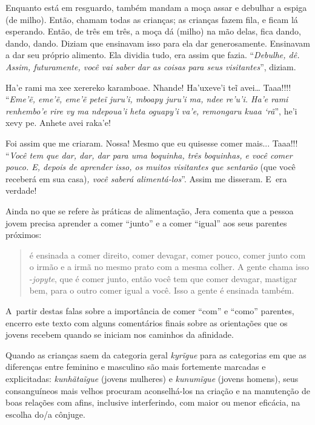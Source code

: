 \begin{paracol}{2}
\bigskip

\switchcolumn
\noindent
Enquanto está em resguardo, também mandam a moça assar e debulhar a
espiga (de milho). Então, chamam todas as crianças; as crianças fazem
fila, e ficam lá esperando. Então, de três em três, a moça dá (milho) na
mão delas, fica dando, dando, dando. Diziam que ensinavam isso para ela
dar generosamente. Ensinavam a dar seu próprio alimento. Ela dividia
tudo, era assim que fazia. ``\emph{Debulhe, dê. Assim, futuramente, você
vai saber dar as coisas para seus visitantes}'', diziam. 

\smallskip

\switchcolumn
\medskip
\noindent
Ha'e rami ma xee xerereko karamboae. Nhande! Ha'uxeve'i teĩ avei\ldots{}
Taaa!!!! ``\emph{Eme'ẽ, eme'ẽ, eme'ẽ peteĩ juru'i, mboapy juru'i ma,
ndee re'u'i. Ha'e rami renhembo'e rire vy ma ndepoua'i heta oguapy'i
va'e, remongaru kuaa `rã}'', he'i xevy pe. Anhete avei raka'e!

\bigskip

\switchcolumn
\noindent
Foi assim que me criaram. Nossa! Mesmo que eu quisesse comer mais...
Taaa!!! ``\emph{Você tem que dar, dar, dar para uma boquinha, três
boquinhas, e você comer pouco. E, depois de aprender isso, os muitos
visitantes} \emph{que sentarão} (que você receberá em sua casa)\emph{,
você saberá alimentá-los}''. Assim me disseram. E~era verdade!
\end{paracol}

\bigskip

Ainda no que se refere às práticas de alimentação, Jera comenta que a
pessoa jovem precisa aprender a comer ``junto'' e a comer ``igual'' aos seus
parentes próximos:

\begin{quote}
 é ensinada a comer direito, comer devagar, comer pouco,
comer junto com o irmão e a irmã no mesmo prato com a mesma colher. A
gente chama isso -\emph{jopyte}, que é comer junto, então você tem que comer
devagar, mastigar bem, para o outro comer igual a você. Isso a gente é
ensinada também.
\end{quote}

A~partir destas falas sobre a importância de comer ``com'' e ``como'' parentes,
encerro este texto com alguns comentários finais sobre as orientações
que os jovens recebem quando se iniciam nos caminhos da afinidade.

Quando as crianças saem da categoria geral \emph{kyrĩgue} para as categorias
em que as diferenças entre feminino e masculino são mais fortemente
marcadas e explicitadas: \emph{kunhãtaĩgue} (jovens mulheres) e
\emph{kunumĩgue} (jovens homens), seus consanguíneos mais velhos procuram
aconselhá-los na criação e na manutenção de boas relações com afins,
inclusive interferindo, com maior ou menor eficácia, na escolha do/a
cônjuge.

